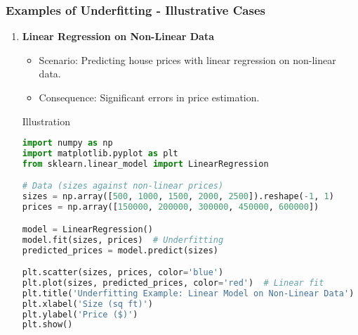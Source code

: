 \documentclass[aspectratio=169]{beamer}
\begin{document}
\begin{frame}[fragile]
    \frametitle{Examples of Underfitting - Illustrative Cases}
    \begin{enumerate}
        \item \textbf{Linear Regression on Non-Linear Data}
          \begin{itemize}
              \item Scenario: Predicting house prices with linear regression on non-linear data.
              \item Consequence: Significant errors in price estimation.
          \end{itemize}
          \begin{block}{Illustration}
              \begin{lstlisting}[language=Python]
import numpy as np
import matplotlib.pyplot as plt
from sklearn.linear_model import LinearRegression

# Data (sizes against non-linear prices)
sizes = np.array([500, 1000, 1500, 2000, 2500]).reshape(-1, 1)
prices = np.array([150000, 200000, 300000, 450000, 600000])

model = LinearRegression()
model.fit(sizes, prices)  # Underfitting
predicted_prices = model.predict(sizes)

plt.scatter(sizes, prices, color='blue')
plt.plot(sizes, predicted_prices, color='red')  # Linear fit
plt.title('Underfitting Example: Linear Model on Non-Linear Data')
plt.xlabel('Size (sq ft)')
plt.ylabel('Price ($)')
plt.show()
              \end{lstlisting}
          \end{block}
    \end{enumerate}
\end{frame}
\end{document}
